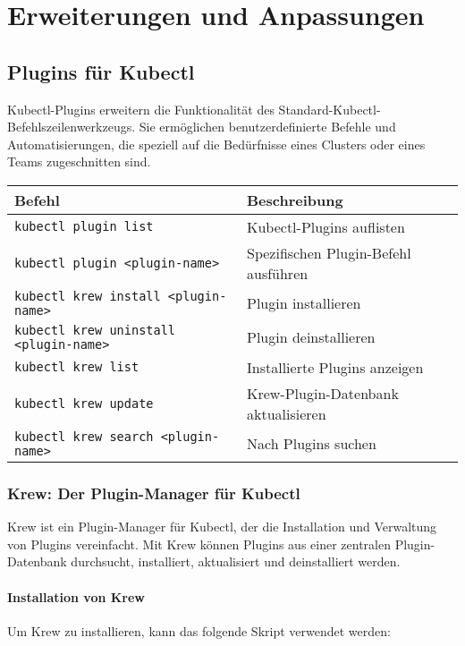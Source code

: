 \chapter{Erweiterungen und Anpassungen}

\section{Plugins für Kubectl}
Kubectl-Plugins erweitern die Funktionalität des Standard-Kubectl-Befehlszeilenwerkzeugs. Sie ermöglichen benutzerdefinierte Befehle und Automatisierungen, die speziell auf die Bedürfnisse eines Clusters oder eines Teams zugeschnitten sind. \\

\noindent
\begin{tabular}{|p{}|p{}|}
\hline
\textbf{Befehl} & \textbf{Beschreibung} \\
\hline
\texttt{kubectl plugin list} & Kubectl-Plugins auflisten \\
\texttt{kubectl plugin <plugin-name>} & Spezifischen Plugin-Befehl ausführen \\
\texttt{kubectl krew install <plugin-name>} & Plugin installieren \\
\texttt{kubectl krew uninstall <plugin-name>} & Plugin deinstallieren \\
\texttt{kubectl krew list} & Installierte Plugins anzeigen \\
\texttt{kubectl krew update} & Krew-Plugin-Datenbank aktualisieren \\
\texttt{kubectl krew search <plugin-name>} & Nach Plugins suchen \\
\hline
\end{tabular}

\subsection{Krew: Der Plugin-Manager für Kubectl}
Krew ist ein Plugin-Manager für Kubectl, der die Installation und Verwaltung von Plugins vereinfacht. Mit Krew können Plugins aus einer zentralen Plugin-Datenbank durchsucht, installiert, aktualisiert und deinstalliert werden.

\subsubsection{Installation von Krew}
Um Krew zu installieren, kann das folgende Skript verwendet werden:


